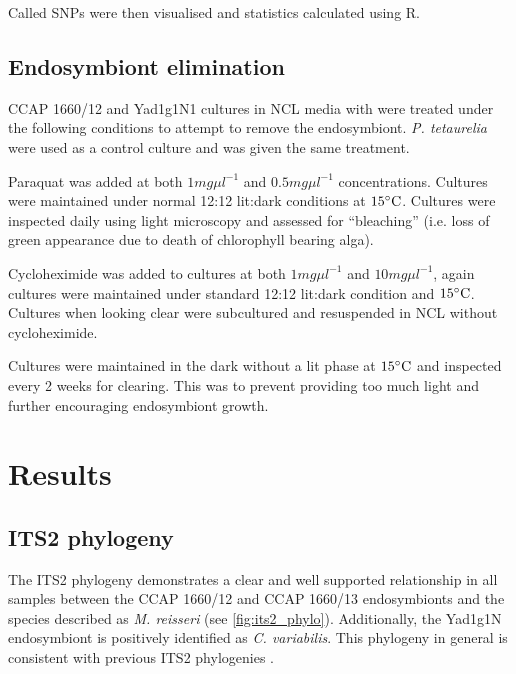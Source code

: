 Called SNPs were then visualised and statistics
calculated using R.

\subsection{Endosymbiont elimination}

CCAP 1660/12 and Yad1g1N1 cultures in NCL media with were treated under the following
conditions to attempt to remove the endosymbiont. 
\textit{P. tetaurelia} were used as a control culture and was
given the same treatment. 

Paraquat was added at both \(1mg\mu l^{-1}\) and
\(0.5mg\mu l^{-1}\) concentrations.
Cultures were maintained under normal 12:12 lit:dark 
conditions at \(15\celsius\).  Cultures were inspected
daily using light microscopy and assessed for ``bleaching'' (i.e. loss of green 
appearance due to death of chlorophyll bearing alga). 

Cycloheximide was added to cultures at both \(1mg\mu l^{-1}\)
and \(10mg\mu l^{-1}\), again cultures were maintained under
standard 12:12 lit:dark condition and \(15\celsius\). 
Cultures when looking clear were subcultured and resuspended in 
NCL without cycloheximide.

Cultures were maintained in the dark without a lit phase
at \(15\celsius\) and inspected every 2 weeks for clearing.
This was to prevent providing too much light and 
further encouraging endosymbiont growth. 


\section{Results}

\subsection{ITS2 phylogeny}

The ITS2 phylogeny demonstrates a clear and well supported relationship in all samples 
between the CCAP 1660/12 and CCAP 1660/13 endosymbionts and the species described as 
\textit{M. reisseri} (see \cref{fig:its2_phylo}).  Additionally,
the Yad1g1N endosymbiont is positively identified as \textit{C. variabilis}. 
This phylogeny in general is consistent with previous ITS2 phylogenies \citep{Hoshina2010}.

